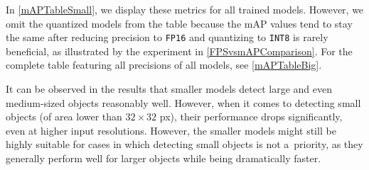 In \autoref{mAPTableSmall}, we display these metrics for all trained models.
However, we omit the quantized models from the table because the mAP values tend
to stay the same after reducing precision to \texttt{FP16} and quantizing to
\texttt{INT8} is rarely beneficial, as illustrated by the experiment in
\autoref{FPSvsmAPComparison}. For the complete table featuring all precisions of
all models, see \autoref{mAPTableBig}.

It can be observed in the results that smaller models detect large and even
medium-sized objects reasonably well. However, when it comes to detecting small
objects (of area lower than $32 \times 32$ px), their performance drops
significantly, even at higher input resolutions. However, the smaller models
might still be highly suitable for cases in which detecting small objects is not
a~priority, as they generally perform well for larger objects while being
dramatically faster.


